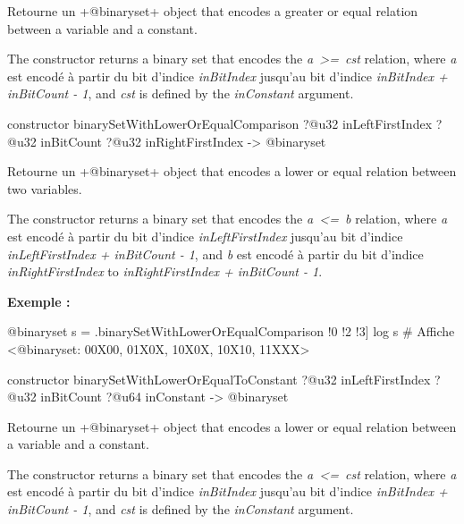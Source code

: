 Retourne un \ggsq+@binaryset+ object that encodes a greater or equal relation between a variable and a constant.

The constructor returns a binary set that encodes the \emph{a~>=~cst} relation, where \emph {a} est encodé à partir du bit d'indice \emph{inBitIndex} jusqu'au bit d'indice \emph{inBitIndex  + inBitCount - 1}, and \emph{cst} is defined by the \emph{inConstant} argument.





\begin{galgas4box}
constructor binarySetWithLowerOrEqualComparison
  ?@u32 inLeftFirstIndex
  ?@u32 inBitCount
  ?@u32 inRightFirstIndex
  -> @binaryset
\end{galgas4box}


Retourne un \ggsq+@binaryset+ object that encodes a lower or equal relation between two variables.

The constructor returns a binary set that encodes the \emph{a~<=~b} relation, where \emph{a} est encodé à partir du bit d'indice \emph{inLeftFirstIndex} jusqu'au bit d'indice \emph{inLeftFirstIndex  + inBitCount - 1}, and \emph{b} est encodé à partir du bit d'indice \emph{inRightFirstIndex} to \emph{inRightFirstIndex + inBitCount - 1}.

\textbf{Exemple :}
\begin{galgas4}
@binaryset s = .binarySetWithLowerOrEqualComparison !0 !2 !3]
log s # Affiche <@binaryset: 00X00, 01X0X, 10X0X, 10X10, 11XXX>
\end{galgas4}





\begin{galgas4box}
constructor binarySetWithLowerOrEqualToConstant
  ?@u32 inLeftFirstIndex
  ?@u32 inBitCount
  ?@u64 inConstant
  -> @binaryset
\end{galgas4box}


Retourne un \ggsq+@binaryset+ object that encodes a lower or equal relation between a variable and a constant.

The constructor returns a binary set that encodes the \emph{a~<=~cst} relation, where \emph {a} est encodé à partir du bit d'indice \emph{inBitIndex} jusqu'au bit d'indice \emph{inBitIndex  + inBitCount - 1}, and \emph{cst} is defined by the \emph{inConstant} argument.




